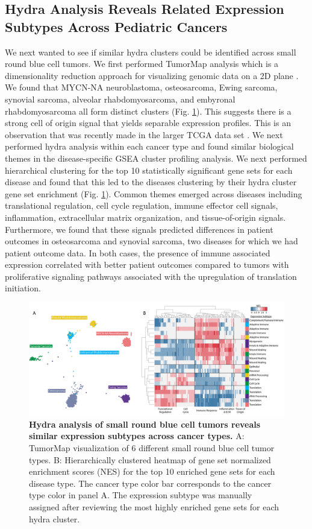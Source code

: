 \documentclass[10pt,letterpaper]{article}
\begin{document}
\subsection{Hydra Analysis Reveals Related Expression Subtypes Across Pediatric Cancers}
We next wanted to see if similar hydra clusters could be identified across small round blue cell tumors. We first performed TumorMap analysis which is a dimensionality reduction approach for visualizing genomic data on a 2D plane \cite{newtonTumorMapExploringMolecular2017}. We found that MYCN-NA neuroblastoma, osteosarcoma, Ewing sarcoma, synovial sarcoma, alveolar rhabdomyosarcoma, and embyronal rhabdomyosarcoma all form distinct clusters (Fig. \ref{pancan}). This suggests there is a strong cell of origin signal that yields separable expression profiles. This is an observation that was recently made in the larger TCGA data set \cite{Hoadley2014}. We next performed hydra analysis within each cancer type and found similar biological themes in the disease-specific GSEA cluster profiling analysis. We next performed hierarchical clustering for the top 10 statistically significant gene sets for each disease and found that this led to the diseases clustering by their hydra cluster gene set enrichment (Fig. \ref{pancan}). Common themes emerged across diseases including translational regulation, cell cycle regulation, immune effector cell signals, inflammation, extracellular matrix organization, and tissue-of-origin signals. Furthermore, we found that these signals predicted differences in patient outcomes in osteosarcoma and synovial sarcoma, two diseases for which we had patient outcome data. In both cases, the presence of immune associated expression correlated with better patient outcomes compared to tumors with proliferative signaling pathways associated with the upregulation of translation initiation.


\begin{figure}[!h]
	\includegraphics[width=1.05\textwidth]{img/hydra-pan-small-round-blue-V2-2x}
	\caption{{\bf Hydra analysis of small round blue cell tumors reveals similar expression subtypes across cancer types.} A: TumorMap visualization of 6 different small round blue cell tumor types. B: Hierarchically clustered heatmap of gene set normalized enrichment scores (NES) for the top 10 enriched gene sets for each disease type. The cancer type color bar corresponds to the cancer type color in panel A. The expression subtype was manually assigned after reviewing the most highly enriched gene sets for each hydra cluster.}
	\label{pancan}
\end{figure}
\end{document}
